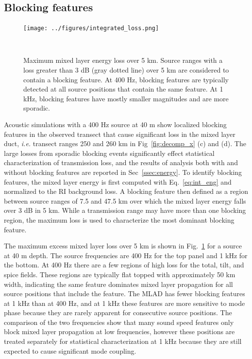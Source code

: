 \documentclass[preprint,NumberedRefs]{JASA}
\begin{document}
\subsection{Blocking features}\label{ssec:blocking}
\begin{figure}
\texttt{[image: ../figures/integrated\_loss.png]}
    \caption{Maximum mixed layer energy loss over 5 km. Source ranges with a loss greater than 3 dB (gray dotted line) over 5 km are considered to contain a blocking feature. At 400 Hz, blocking features are typically detected at all source positions that contain the same feature. At 1 kHz, blocking features have mostly smaller magnitudes and are more sporadic.}
    \label{fig:blocking}
\end{figure}

Acoustic simulations with a 400 Hz source at 40 m show localized blocking features in the observed transect that cause significant loss in the mixed layer duct, \emph{i.e.} transect ranges 250 and 260 km in Fig~\ref{fig:decomp_x} (c) and (d). The large losses from sporadic blocking events significantly effect statistical characterization of transmission loss, and the results of analysis both with and without blocking features are reported in Sec~\ref{ssec:energy}. To identify blocking features, the mixed layer energy is first computed with Eq.~\eqref{eq:int_eng} and normalized to the RI background loss. A blocking feature then defined as a region between source ranges of 7.5 and 47.5 km over which the mixed layer energy falls over 3 dB in 5 km. While a transmission range may have more than one blocking region, the maximum loss is used to characterize the most dominant blocking feature.

The maximum excess mixed layer loss over 5 km is shown in Fig.~\ref{fig:blocking} for a source at 40 m depth. The source frequencies are 400 Hz for the top panel and 1 kHz for the bottom. At 400 Hz there are a few regions of high loss for the total, tilt, and spice fields. These regions are typically flat topped with approximately 50 km width, indicating the same feature dominates mixed layer propagation for all source positions that include the feature. The MLAD has fewer blocking features at 1 kHz than at 400 Hz, and at 1 kHz these features are more sensitive to mode phase because they are rarely apparent for consecutive source positions. The comparison of the two frequencies show that many sound speed features only block mixed layer propagation at low frequencies, however these positions are treated separately for statistical characterization at 1 kHz because they are still expected to cause significant mode coupling.
\end{document}
